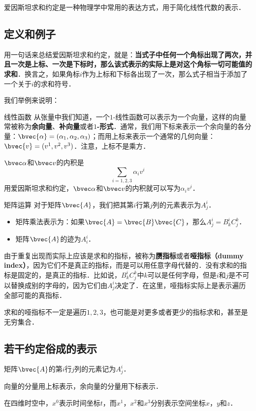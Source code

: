 
\begin{issues}
\issueTODO
{}
\end{issues}



爱因斯坦求和约定是一种物理学中常用的表达方式，用于简化线性代数的表示．

\subsection{定义和例子}

用一句话来总结爱因斯坦求和约定，就是：\textbf{当式子中任何一个角标出现了两次，并且一次是上标、一次是下标时，那么该式表示的实际上是对这个角标一切可能值的求和}．换言之，如果角标$i$作为上标和下标各出现了一次，那么式子相当于添加了一个关于$i$的求和符号．

我们举例来说明：

\begin{example}{线性函数}
从张量中我们知道，一个$1$-线性函数可以表示为一个向量，这样的向量常被称为\textbf{余向量}、\textbf{补向量}或者\textbf{$1$-形式}．通常，我们用下标来表示一个余向量的各分量：$\bvec{\alpha}=(\alpha_1, \alpha_2, \alpha_3)$；而用上标来表示一个通常的几何向量：$\bvec{v}=(v^1, v^2, v^3)$．注意，上标不是乘方．

$\bvec\alpha$和$\bvec v$的内积是$$\sum\limits_{i=1, 2, 3}\alpha_i v^i$$
用爱因斯坦求和约定，$\bvec\alpha$和$\bvec v$的内积就可以写为$\alpha_i v^i$．
\end{example}

\begin{example}{矩阵运算}
对于矩阵$\bvec{A}$，我们把其第$i$行第$j$列的元素表示为$A^i_j$．
\begin{itemize}
\item 矩阵乘法表示为：如果$\bvec{A}=\bvec{B}\bvec{C}$，那么$A^i_j=B^i_k C^k_j$．
\item 矩阵$\bvec{A}$的迹为$A^i_i$．

\end{itemize}
\end{example}

由于重复出现而实际上应该是求和的指标，被称为\textbf{赝指标}或者\textbf{哑指标（dummy index）}，因为它们不是真正的指标，而是可以用任意字母代替的．没有求和的指标是固定的，是真正的指标．比如说，$B^i_k C^k_j$中$k$可以是任何字母，但是$i$和$j$是不可以替换成别的字母的，因为它们由$A^i_j$决定了．在这里，哑指标实际上是表示遍历全部可能的真指标．

求和的哑指标不一定是遍历$1, 2, 3$，也可能是对更多或者更少的指标求和，甚至是无穷集合．

\subsection{若干约定俗成的表示}

矩阵$\bvec{A}$的第$i$行$j$列的元素记为$A^i_j$．

向量的分量用上标表示，余向量的分量用下标表示．

在四维时空中，$x^0$表示时间坐标$t$，而$x^1$，$x^2$和$x^3$分别表示空间坐标$x$，$y$和$z$．




